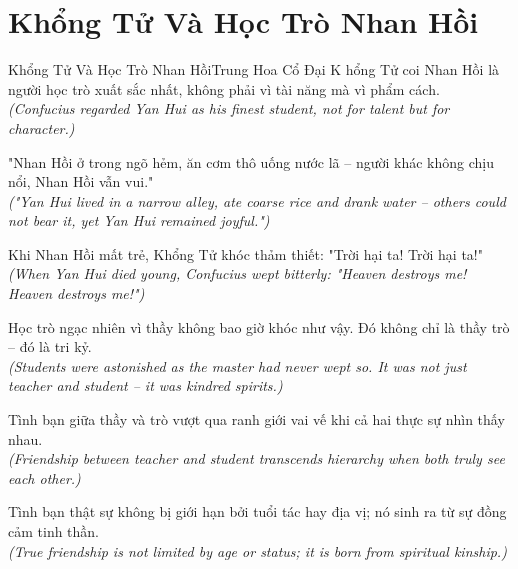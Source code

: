 \section{Khổng Tử Và Học Trò Nhan Hồi}
\begin{truyen}{Khổng Tử Và Học Trò Nhan Hồi}{Trung Hoa Cổ Đại}
K hổng Tử coi Nhan Hồi là người học trò xuất sắc nhất, không phải vì tài năng mà vì phẩm cách.\\
\textit{(Confucius regarded Yan Hui as his finest student, not for talent but for character.)}

"Nhan Hồi ở trong ngõ hẻm, ăn cơm thô uống nước lã -- người khác không chịu nổi, Nhan Hồi vẫn vui."\\
\textit{("Yan Hui lived in a narrow alley, ate coarse rice and drank water -- others could not bear it, yet Yan Hui remained joyful.")}

Khi Nhan Hồi mất trẻ, Khổng Tử khóc thảm thiết: "Trời hại ta! Trời hại ta!"\\
\textit{(When Yan Hui died young, Confucius wept bitterly: "Heaven destroys me! Heaven destroys me!")}

Học trò ngạc nhiên vì thầy không bao giờ khóc như vậy. Đó không chỉ là thầy trò -- đó là tri kỷ.\\
\textit{(Students were astonished as the master had never wept so. It was not just teacher and student -- it was kindred spirits.)}

Tình bạn giữa thầy và trò vượt qua ranh giới vai vế khi cả hai thực sự nhìn thấy nhau.\\
\textit{(Friendship between teacher and student transcends hierarchy when both truly see each other.)}

\end{truyen}
\begin{baihoc}
  Tình bạn thật sự không bị giới hạn bởi tuổi tác hay địa vị; nó sinh ra từ sự đồng cảm tinh thần.\\
  \textit{(True friendship is not limited by age or status; it is born from spiritual kinship.)}
\end{baihoc}

